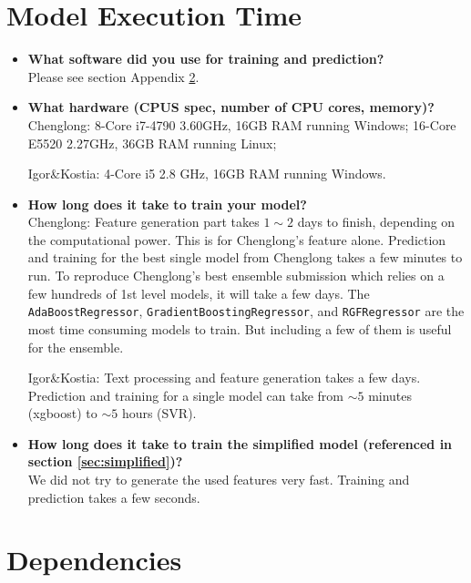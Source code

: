 \documentclass[12pt]{article}
\begin{document}
\begin{appendices}
\newpage

\section{Model Execution Time}

\begin{itemize}
\item \textbf{What software did you use for training and prediction?}\\
Please see section Appendix \ref{sec:dependencies}.

\item \textbf{What hardware (CPUS spec, number of CPU cores, memory)?}\\
Chenglong: 8-Core i7-4790 3.60GHz, 16GB RAM running Windows; 16-Core E5520 2.27GHz, 36GB RAM running Linux;

Igor\&Kostia: 4-Core i5 2.8 GHz, 16GB RAM running Windows.

\item \textbf{How long does it take to train your model?}\\
Chenglong: Feature generation part takes $1\sim 2$ days to finish, depending on the computational power. This is for Chenglong's feature alone. Prediction and training for the best single model from Chenglong takes a few minutes to run. To reproduce Chenglong's best ensemble submission which relies on a few hundreds of 1st level models, it will take a few days. The \texttt{AdaBoostRegressor}, \texttt{GradientBoostingRegressor}, and \texttt{RGFRegressor} are the most time consuming models to train. But including a few of them is useful for the ensemble.

Igor\&Kostia: Text processing and feature generation takes a few days.  Prediction and training for a single model can take from $\sim 5$ minutes (xgboost) to $\sim 5$ hours (SVR).

\item \textbf{How long does it take to train the simplified model (referenced in section \ref{sec:simplified})?}\\
We did not try to generate the used features very fast. Training and prediction takes a few seconds.

\end{itemize}





\section{Dependencies}
\label{sec:dependencies}

\end{appendices}
\end{document}
